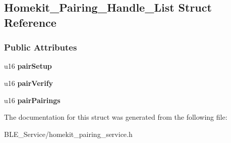 \hypertarget{struct_homekit___pairing___handle___list}{}\subsection{Homekit\+\_\+\+Pairing\+\_\+\+Handle\+\_\+\+List Struct Reference}
\label{struct_homekit___pairing___handle___list}
\subsubsection*{Public Attributes}
\begin{DoxyCompactItemize}
\item 
u16 {\bfseries pair\+Setup}\hypertarget{struct_homekit___pairing___handle___list_ac8ce0802ced9cff42bcab371b9622fce}{}\label{struct_homekit___pairing___handle___list_ac8ce0802ced9cff42bcab371b9622fce}

\item 
u16 {\bfseries pair\+Verify}\hypertarget{struct_homekit___pairing___handle___list_a817372af3edd83b9fe31c0cfff147972}{}\label{struct_homekit___pairing___handle___list_a817372af3edd83b9fe31c0cfff147972}

\item 
u16 {\bfseries pair\+Pairings}\hypertarget{struct_homekit___pairing___handle___list_a4f5b54b66f805d8b9c307b4dcaeec1e4}{}\label{struct_homekit___pairing___handle___list_a4f5b54b66f805d8b9c307b4dcaeec1e4}

\end{DoxyCompactItemize}


The documentation for this struct was generated from the following file\+:\begin{DoxyCompactItemize}
\item 
B\+L\+E\+\_\+\+Service/homekit\+\_\+pairing\+\_\+service.\+h\end{DoxyCompactItemize}
